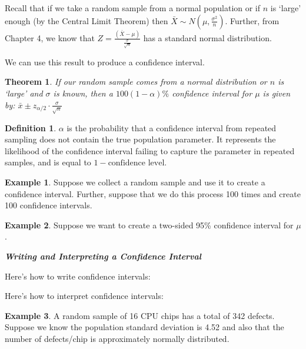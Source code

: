 \documentclass[
  11pt,
  oneside]{book}
\newtheorem{theorem}{Theorem}[chapter]
\theoremstyle{definition}
\newtheorem{definition}{Definition}[chapter]
\theoremstyle{definition}
\newtheorem{example}{Example}[chapter]
\theoremstyle{definition}
\theoremstyle{definition}
\theoremstyle{remark}
\begin{document}
Recall that if we take a random sample from a normal population or if \(n\) is `large' enough (by the Central Limit Theorem) then \(\bar{X} \sim N(\mu, \frac{\sigma^{2}}{n})\). Further, from Chapter 4, we know that \(Z = \frac{(\bar{X}-\mu)}{\frac{\sigma}{\sqrt{n}}}\) has a standard normal distribution.

We can use this result to produce a confidence interval.

\begin{theorem}
If our random sample comes from a normal distribution or \(n\) is `large' and \(\sigma\) is known, then a \(100(1-\alpha)\%\) confidence interval for \(\mu\) is given by:
\({\bar{x} \pm z_{\alpha/2} \cdot \frac{\sigma}{\sqrt{n}}}\)
\end{theorem}

\newpage

\begin{definition}
\(\alpha\) is the probability that a confidence interval from repeated sampling does not contain the true population parameter. It represents the likelihood of the confidence interval failing to capture the parameter in repeated samples, and is equal to \(1 - \text{confidence level}\).
\end{definition}

\begin{example}
Suppose we collect a random sample and use it to create a confidence interval. Further, suppose that we do this process 100 times and create 100 confidence intervals.
\end{example}

\vspace{7cm}

\begin{example}
Suppose we want to create a two-sided 95\% confidence interval for \(\mu\).
\end{example}

\newpage

\textbf{\emph{Writing and Interpreting a Confidence Interval}}

Here's how to write confidence intervals:

\vfill

Here's how to interpret confidence intervals:

\vfill

\newpage

\begin{example}
A random sample of 16 CPU chips has a total of 342 defects. Suppose we know the population standard deviation is 4.52 and also that the number of defects/chip is approximately normally distributed.
\end{example}
\end{document}
